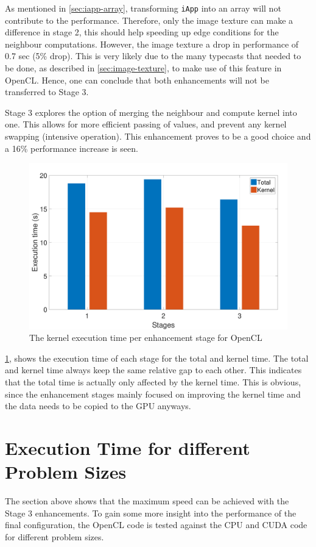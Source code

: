 \documentclass[final]{report}
\begin{document}
As mentioned in \cref{sec:iapp-array}, transforming \texttt{iApp} into an array will not contribute to the performance.
Therefore, only the image texture can make a difference in stage 2, this should help speeding up edge conditions for the neighbour computations.
However, the image texture a drop in performance of 0.7 sec (5\% drop).
This is very likely due to the many typecasts that needed to be done, as described in \cref{sec:image-texture}, to make use of this feature in OpenCL.
Hence, one can conclude that both enhancements will not be transferred to Stage 3.

Stage 3 explores the option of merging the neighbour and compute kernel into one.
This allows for more efficient passing of values, and prevent any kernel swapping (intensive operation).
This enhancement proves to be a good choice and a 16\% performance increase is seen.

\begin{figure}[H]
\centering
    \includegraphics[width=\textwidth]{resources/opencl-per-stage-graph.pdf}
    \caption{The kernel execution time per enhancement stage for OpenCL}
    \label{fig:opencl-per-stage-graph}
\end{figure}

\cref{fig:opencl-per-stage-graph}, shows the execution time of each stage for the total and kernel time.
The total and kernel time always keep the same relative gap to each other.
This indicates that the total time is actually only affected by the kernel time.
This is obvious, since the enhancement stages mainly focused on improving the kernel time and the data needs to be copied to the GPU anyways.


\section{Execution Time for different Problem Sizes}
The section above shows that the maximum speed can be achieved with the Stage 3 enhancements.
To gain some more insight into the performance of the final configuration, the OpenCL code is tested against the CPU and CUDA code for different problem sizes.
\end{document}
